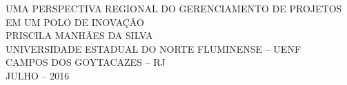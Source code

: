 \begin{titlepage}
 \begin{center}
   {\large UMA PERSPECTIVA REGIONAL DO GERENCIAMENTO DE PROJETOS EM UM POLO DE INOVAÇÃO} \\ [7cm]
   {\large PRISCILA MANHÃES DA SILVA} \\ [4cm]
   \vfill
   {\large UNIVERSIDADE ESTADUAL DO NORTE FLUMINENSE – UENF} \\ [1.5cm]
   {\large CAMPOS DOS GOYTACAZES – RJ} \\
   {\large JULHO – 2016}
 \end{center}
\end{titlepage}
